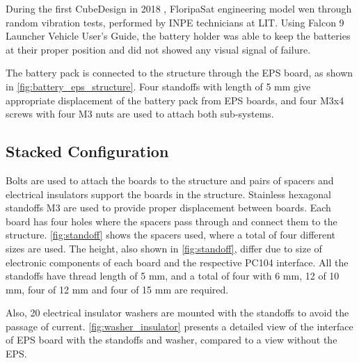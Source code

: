During the first CubeDesign in 2018 \cite{Cubedesign_2018}, FloripaSat engineering model wen through random vibration tests, performed by INPE technicians at LIT. Using Falcon 9 Launcher Vehicle User's Guide, the battery holder was able to keep the batteries at their proper position and did not showed any visual signal of failure.

The battery pack is connected to the structure through the EPS board, as shown in \autoref{fig:battery_eps_structure}. Four standoffs with length of 5 mm give appropriate displacement of the battery pack from EPS boards, and four M3x4 screws with four M3 nuts are used to attach both sub-systems.


\newpage

\subsection{Stacked Configuration}
Bolts are used to attach the boards to the structure and pairs of spacers and electrical insulators support the boards in the structure. Stainless hexagonal standoffs M3 are used to provide proper displacement between boards. Each board has four holes where the spacers pass through and connect them to the structure. \autoref{fig:standoff} shows the spacers used, where a total of four different sizes are used. The height, also shown in \autoref{fig:standoff}, differ due to size of electronic components of each board and the respective PC104 interface. All the standoffs have thread length of 5 mm, and a total of four with 6 mm, 12 of 10 mm, four of 12 mm and four of 15 mm are required. 


Also, 20 electrical insulator washers are mounted with the standoffs to avoid the passage of current. \autoref{fig:washer_insulator} presents a detailed view of the interface of EPS board with the standoffs and washer, compared to a view without the EPS.

